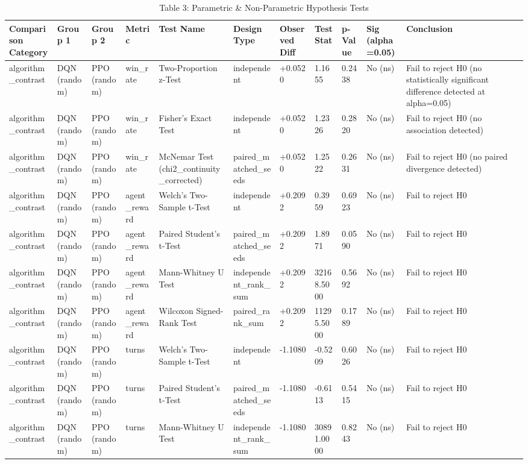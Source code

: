 \begin{table}
\caption{Table 3: Parametric & Non-Parametric Hypothesis Tests}
\label{tab:table3_comparative_hypothesis_tests}
\begin{tabular}{lllllllllll}
\toprule
Comparison Category & Group 1 & Group 2 & Metric & Test Name & Design Type & Observed Diff & Test Stat & p-Value & Sig (alpha=0.05) & Conclusion \\
\midrule
algorithm\_contrast & DQN (random) & PPO (random) & win\_rate & Two-Proportion z-Test & independent & +0.0520 & 1.1655 & 0.2438 & No (ns) & Fail to reject H0 (no statistically significant difference detected at alpha=0.05) \\
algorithm\_contrast & DQN (random) & PPO (random) & win\_rate & Fisher's Exact Test & independent & +0.0520 & 1.2326 & 0.2820 & No (ns) & Fail to reject H0 (no association detected) \\
algorithm\_contrast & DQN (random) & PPO (random) & win\_rate & McNemar Test (chi2\_continuity\_corrected) & paired\_matched\_seeds & +0.0520 & 1.2522 & 0.2631 & No (ns) & Fail to reject H0 (no paired divergence detected) \\
algorithm\_contrast & DQN (random) & PPO (random) & agent\_reward & Welch's Two-Sample t-Test & independent & +0.2092 & 0.3959 & 0.6923 & No (ns) & Fail to reject H0 \\
algorithm\_contrast & DQN (random) & PPO (random) & agent\_reward & Paired Student's t-Test & paired\_matched\_seeds & +0.2092 & 1.8971 & 0.0590 & No (ns) & Fail to reject H0 \\
algorithm\_contrast & DQN (random) & PPO (random) & agent\_reward & Mann-Whitney U Test & independent\_rank\_sum & +0.2092 & 32168.5000 & 0.5692 & No (ns) & Fail to reject H0 \\
algorithm\_contrast & DQN (random) & PPO (random) & agent\_reward & Wilcoxon Signed-Rank Test & paired\_rank\_sum & +0.2092 & 11295.5000 & 0.1789 & No (ns) & Fail to reject H0 \\
algorithm\_contrast & DQN (random) & PPO (random) & turns & Welch's Two-Sample t-Test & independent & -1.1080 & -0.5209 & 0.6026 & No (ns) & Fail to reject H0 \\
algorithm\_contrast & DQN (random) & PPO (random) & turns & Paired Student's t-Test & paired\_matched\_seeds & -1.1080 & -0.6113 & 0.5415 & No (ns) & Fail to reject H0 \\
algorithm\_contrast & DQN (random) & PPO (random) & turns & Mann-Whitney U Test & independent\_rank\_sum & -1.1080 & 30891.0000 & 0.8243 & No (ns) & Fail to reject H0 \\

\end{tabular}
\end{table}
